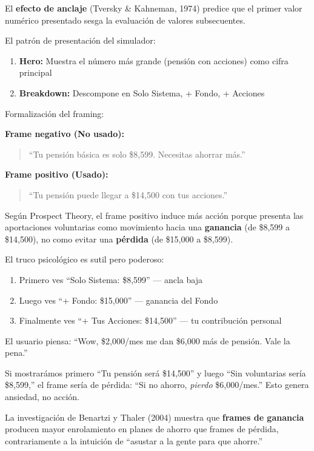\documentclass[11pt,a4paper]{report}
\begin{document}
\begin{tcolorbox}[colback=blue!5!white, colframe=blue!75!black, title=\textbf{Definici\'on Formal: Anclaje y Framing en Presentaci\'on de Resultados}]
El \textbf{efecto de anclaje} (Tversky \& Kahneman, 1974) predice que el primer valor num\'erico presentado sesga la evaluaci\'on de valores subsecuentes.

El patr\'on de presentaci\'on del simulador:
\begin{enumerate}
  \item \textbf{Hero:} Muestra el n\'umero m\'as grande (pensi\'on con acciones) como cifra principal
  \item \textbf{Breakdown:} Descompone en Solo Sistema, + Fondo, + Acciones
\end{enumerate}

Formalizaci\'on del framing:

\textbf{Frame negativo (No usado):}
\begin{quote}
``Tu pensi\'on b\'asica es solo \$8,599. Necesitas ahorrar m\'as.''
\end{quote}

\textbf{Frame positivo (Usado):}
\begin{quote}
``Tu pensi\'on puede llegar a \$14,500 con tus acciones.''
\end{quote}

Seg\'un Prospect Theory, el frame positivo induce m\'as acci\'on porque presenta las aportaciones voluntarias como movimiento hacia una \textbf{ganancia} (de \$8,599 a \$14,500), no como evitar una \textbf{p\'erdida} (de \$15,000 a \$8,599).
\end{tcolorbox}

\begin{tcolorbox}[colback=green!5!white, colframe=green!50!black, title=\textbf{Intuici\'on: Mostrar el Baseline Primero Ancla al Usuario}]
El truco psicol\'ogico es sutil pero poderoso:
\begin{enumerate}
  \item Primero ves ``Solo Sistema: \$8,599'' --- ancla baja
  \item Luego ves ``+ Fondo: \$15,000'' --- ganancia del Fondo
  \item Finalmente ves ``+ Tus Acciones: \$14,500'' --- tu contribuci\'on personal
\end{enumerate}

El usuario piensa: ``Wow, \$2,000/mes me dan \$6,000 m\'as de pensi\'on. Vale la pena.''

Si mostrar\'amos primero ``Tu pensi\'on ser\'a \$14,500'' y luego ``Sin voluntarias ser\'ia \$8,599,'' el frame ser\'ia de p\'erdida: ``Si no ahorro, \textit{pierdo} \$6,000/mes.'' Esto genera ansiedad, no acci\'on.

La investigaci\'on de Benartzi y Thaler (2004) muestra que \textbf{frames de ganancia} producen mayor enrolamiento en planes de ahorro que frames de p\'erdida, contrariamente a la intuici\'on de ``asustar a la gente para que ahorre.''
\end{tcolorbox}
\end{document}
